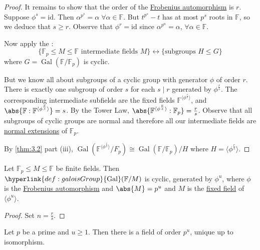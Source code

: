 \documentclass{article}
\DeclareMathOperator{\Gal}{Gal}
\newcommand{\F}{\mathbb{F}}
\begin{document}
\begin{proof}
    It remains to show that the order of the \hyperlink{def:frob}{Frobenius automorphism} is $r$.
    Suppose $\phi^s = \mathrm{id}$.
    Then $\alpha^{p^s} = \alpha \; \forall \alpha \in \F$.
    But $t^{p^s} - t$ has at most $p^s$ roots in $\F$, so we deduce that $s \geq r$.
    Observe that $\phi^r = \mathrm{id}$ since $\alpha^{p^n} = \alpha$, $\forall \alpha \in \F$.

    Now apply the :
    \begin{equation*}
        \{\F_p \leq M \leq \F \text{ intermediate fields } M\} \longleftrightarrow \{\text{subgroups } H \leq G\}
    \end{equation*}
    where $G = \Gal(\F/\F_p)$ is cyclic.

    But we know all about subgroups of a cyclic group with generator $\phi$ of order $r$.
    There is exactly one subgroup of order $s$ for each $s \mid r$ generated by $\phi^\frac{r}{s}$.
    The corresponding intermediate subfields are the fixed fields $\F^{\langle \phi^\frac{r}{s} \rangle}$, and $\abs{\F:\F^{\langle \phi^\frac{r}{s} \rangle}} = s$.
    By the Tower Law, $\abs{\F^{\langle \phi^\frac{r}{s} \rangle}:\F_p} = \frac{r}{s}$.
    Observe that all subgroups of cyclic groups are normal and therefore all our intermediate fields are \hyperlink{def:normal}{normal extensions} of $\F_p$.

    By \cref{thm:3.2} part (iii), $\Gal(\F^{\langle \phi^\frac{r}{s} \rangle}/F_p) \cong \Gal(\F/\F_p) / H$ where $H = \langle \phi^\frac{r}{s} \rangle$.
\end{proof}

\begin{ncor}\label{cor:3.17}
    Let $\F_p \leq M \leq \F$ be finite fields.
    Then $\hyperlink{def:galoisGroup}{\Gal}(\F/M)$ is cyclic, generated by $\phi^u$, where $\phi$ is the \hyperlink{def:frob}{Frobenius automorphism} and $\abs{M} = p^u$ and $M$ is the \hyperlink{def:fixedField}{fixed field} of $\langle \phi^u \rangle$.
\end{ncor}

\begin{proof}
    Set $n = \frac{r}{s}$.
\end{proof}

\begin{nthm}\label{thm:3.18}
    Let $p$ be a prime and $u \geq 1$.
    Then there is a field of order $p^u$, unique up to isomorphism.
\end{nthm}
\end{document}
